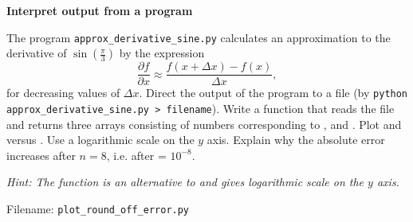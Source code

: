 \begin{Problem}{\textbf{Interpret output from a program}}

\noindent The program \texttt{approx\_derivative\_sine.py} calculates an approximation to the derivative of $\sin\left(\frac{\pi}{3} \right)$ by the expression
\begin{equation*}
    \frac{\partial f}{\partial x} \approx \frac{f(x + \Delta x ) - f(x)}{\Delta x} ,
\end{equation*}
for decreasing values of $\Delta x$. Direct the output of the program to a file (by \texttt{python approx\_derivative\_sine.py > filename}). Write a function that reads the file and returns three arrays consisting of numbers corresponding to ,  and . Plot  and  versus . Use a logarithmic scale on the $y$ axis. Explain why the absolute error increases after $n=8$, i.e. after  = $10^{-8}$.


\emph{Hint: The function  is an alternative to  and gives logarithmic scale on the $y$ axis.}

Filename: \texttt{plot\_round\_off\_error.py}
\end{Problem}

